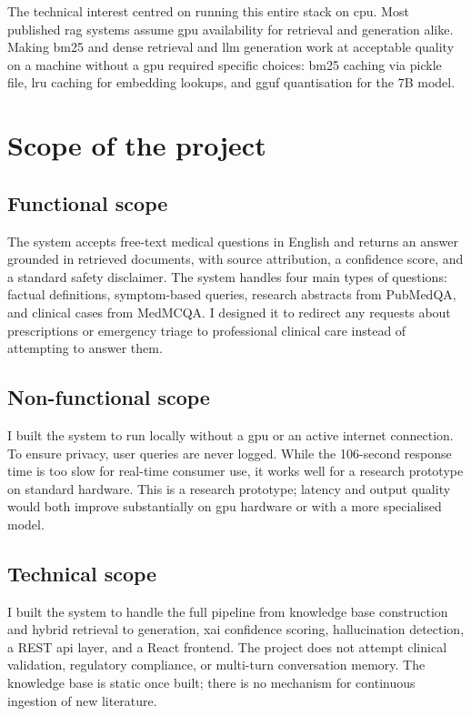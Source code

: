 The technical interest centred on running this entire stack on \ac{cpu}. Most published \ac{rag} systems assume \ac{gpu} availability for retrieval and generation alike. Making \ac{bm25} and dense retrieval and \ac{llm} generation work at acceptable quality on a machine without a \ac{gpu} required specific choices: \ac{bm25} caching via pickle file, \ac{lru} caching for embedding lookups, and \ac{gguf} quantisation for the 7B model.

\section{Scope of the project}

\subsection{Functional scope}

The system accepts free-text medical questions in English and returns an answer grounded in retrieved documents, with source attribution, a confidence score, and a standard safety disclaimer. The system handles four main types of questions: factual definitions, symptom-based queries, research abstracts from PubMedQA, and clinical cases from MedMCQA. I designed it to redirect any requests about prescriptions or emergency triage to professional clinical care instead of attempting to answer them.

\subsection{Non-functional scope}

I built the system to run locally without a \ac{gpu} or an active internet connection. To ensure privacy, user queries are never logged. While the 106-second response time is too slow for real-time consumer use, it works well for a research prototype on standard hardware. This is a research prototype; latency and output quality would both improve substantially on \ac{gpu} hardware or with a more specialised model.

\subsection{Technical scope}

I built the system to handle the full pipeline from knowledge base construction and hybrid retrieval to generation, \ac{xai} confidence scoring, hallucination detection, a REST \ac{api} layer, and a React frontend. The project does not attempt clinical validation, regulatory compliance, or multi-turn conversation memory. The knowledge base is static once built; there is no mechanism for continuous ingestion of new literature.

